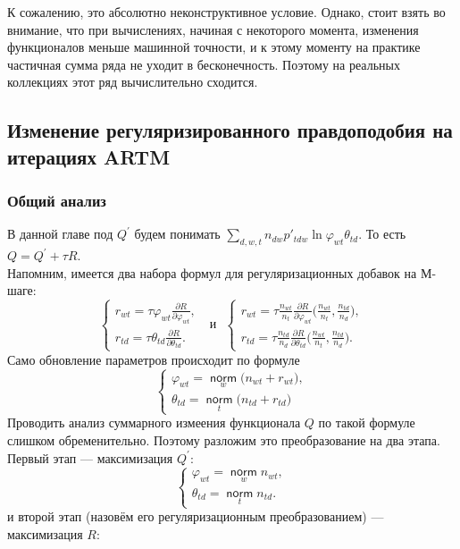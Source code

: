 \documentclass[12pt]{article}
\renewcommand{\phi}{\varphi}
\newcommand{\norm}{\mathop{\mathsf{norm}}\limits}
\begin{document}
К сожалению, это абсолютно неконструктивное условие. Однако, стоит взять во внимание, что при вычислениях, начиная с некоторого момента, изменения функционалов меньше машинной точности, и к этому моменту на практике частичная сумма ряда не уходит в бесконечность. Поэтому  на реальных коллекциях этот ряд вычислительно сходится.
	\subsection{Изменение регуляризированного правдоподобия на итерациях ARTM}
	\subsubsection{Общий анализ}
В данной главе под $Q^{\prime}$ будем понимать $\sum\limits_{d, w, t} n_{dw} p'_{tdw} \ln{\phi_{wt}\theta_{td}}$. То есть $Q = Q^{\prime} + \tau R$.\\
Напомним, имеется  два набора формул для регуляризационных добавок на М-шаге:
\[
\left\{
	\begin{aligned}
		r_{wt}= \tau\phi_{wt} \frac{\partial{R}}{\partial{\phi_{wt}}},\\
		r_{td} = \tau\theta_{td} \frac{\partial{R}}{\partial{\theta_{td}}}.
	\end{aligned}
\right.
\text{~~и~~}
\left\{
	\begin{aligned}
		r_{wt} = \tau \frac{n_{wt}}{n_t} \frac{\partial{R}}{\partial{\phi_{wt}}} \biggl(\frac{n_{wt}}{n_t}, \frac{n_{td}}{n_d}\biggr),\\
		r_{td}= \tau \frac{n_{td}}{n_d} \frac{\partial{R}}{\partial{\theta_{td}}} \biggl(\frac{n_{wt}}{n_t}, \frac{n_{td}}{n_d}\biggr).
	\end{aligned}
\right.
\]
Само обновление параметров происходит по формуле 
\[
\left\{
\begin{aligned}
 \phi_{wt}  = \norm_w \bigl(n_{wt} + r_{wt} \bigr),\\
\theta_{td} = \norm_t  \bigl(n_{td} + r_{td}\bigr)
\end{aligned}
\right.
\]
Проводить анализ суммарного измеения функционала $Q$ по такой формуле слишком обременительно. Поэтому  разложим это преобразование на два этапа. Первый этап --- максимизация $Q^{\prime}$:
\[
\left\{
	\begin{aligned}
		\phi_{wt} = \norm_w  n_{wt},\\
		\theta_{td} = \norm_t n_{td} .
	\end{aligned}
\right.
\]
и второй этап (назовём его регуляризационным преобразованием) --- максимизация $R$:
\end{document}
